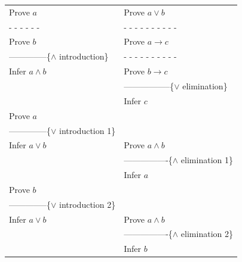 \begin{figure}
\begin{center}
\begin{tabular}{ll}
Prove $a$                                               & Prove $a \vee b$                                  \\
 - - - - - -                                            &  - - - - - - - - - -                              \\
Prove $b$                                               & Prove $a \rightarrow c$                           \\
--------------\{$\wedge$ introduction\}                 &  - - - - - - - - - -                              \\
Infer $a \wedge b$                                      & Prove $b \rightarrow c$                           \\
                                                        & -----------------\{$\vee$ elimination\}           \\
                                                        & Infer $c$                                         \\
Prove $a$                                               &                                                   \\
--------------\{$\vee$ introduction 1\}                 &                                                   \\
Infer $a \vee  b$                                       & Prove $a \wedge b$                                \\
                                                        & ----------------\{$\wedge$ elimination 1\}        \\
                                                        & Infer $a$                                         \\
Prove $b$                                               &                                                   \\
--------------\{$\vee$ introduction 2\}                 &                                                   \\
Infer $a \vee  b$                                       & Prove $a \wedge b$                                \\
                                                        & ----------------\{$\wedge$ elimination 2\}        \\
                                                        & Infer $b$                                         \\

\end{tabular}
\end{center}
\end{figure}
